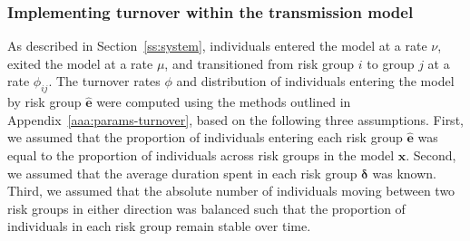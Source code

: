 \subsubsection{Implementing turnover within the transmission model}
As described in Section~\ref{ss:system}, individuals
entered the model at a rate $\nu$,
exited the model at a rate $\mu$,
and transitioned from risk group $i$ to group $j$ at a rate $\phi_{ij}$.
The turnover rates $\phi$ and
distribution of individuals entering the model by risk group $\bm{\hat{e}}$
were computed using the methods outlined in
Appendix~\ref{aaa:params-turnover}, based on the following three assumptions.			%
First, we assumed that
the proportion of individuals entering each risk group $\bm{\hat{e}}$
was equal to the proportion of individuals across risk groups in the model $\bm{\hat{x}}$.
Second, we assumed that
the average duration spent in each risk group $\bm{\delta}$ was known.
Third, we assumed that
the absolute number of individuals moving between two risk groups in either direction was balanced such that
the proportion of individuals in each risk group remain stable over time.   %
